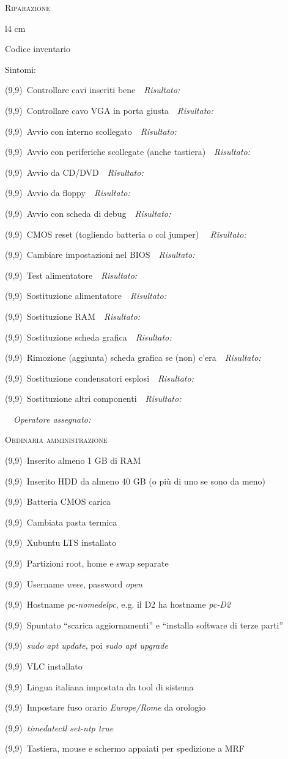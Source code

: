 \documentclass[a4paper,12pt,twoside]{article}
\newcommand{\rulespace}[1]{\ \ \textit{\small #1} \hrulefill\par}
\renewcommand{\r}{\rulespace{Risultato:}}
\renewcommand{\c}{\framebox(9,9){}\, }
\newcommand{\ci}{\hspace{1cm}\c} %
\begin{document}
\thispagestyle{empty}
{\Large\textsc{Riparazione}}\par
\begin{wrapfigure}{l}{4 cm}
	\vspace{-0.5cm}
	\begin{framed}
		\begin{centering}
		{\footnotesize Codice inventario\par}
		\vspace{2.4cm}
		\end{centering}		
	\end{framed}
	\vspace{-1.4cm}
\end{wrapfigure}
Sintomi: \hrulefill\par
\hrulefill\par
\c Controllare cavi inseriti bene\r
\c Controllare cavo VGA in porta giusta\r
\c Avvio con interno scollegato\r
\c Avvio con periferiche scollegate (anche tastiera)\r
\c Avvio da CD/DVD\r
\c Avvio da floppy\r
\c Avvio con scheda di debug\r
\c CMOS reset (togliendo batteria o col jumper) \r
\c Cambiare impostazioni nel BIOS\r
\c Test alimentatore\r
\c Sostituzione alimentatore\r
\c Sostituzione RAM\r
\c Sostituzione scheda grafica\r
\c Rimozione (aggiunta) scheda grafica se (non) c'era\r
\c Sostituzione condensatori esplosi\r
\c Sostituzione altri componenti\r
\rulespace{Operatore assegnato:}
{\Large\textsc{Ordinaria amministrazione}}\par
\c Inserito almeno 1 GB di RAM\par
\c Inserito HDD da almeno 40 GB (o più di uno se sono da meno)\par
\c Batteria CMOS carica\par
\c Cambiata pasta termica\par
\c Xubuntu LTS installato\par
\ci Partizioni root, home e swap separate\par
\ci Username \textit{weee}, password \textit{open}\par
\ci Hostname \textit{pc-nomedelpc}, e.g. il D2 ha hostname \textit{pc-D2}\par
\ci Spuntato ``scarica aggiornamenti'' e ``installa software di terze parti''\par
\ci \textit{sudo apt update}, poi \textit{sudo apt upgrade}\par
\ci VLC installato\par
\ci Lingua italiana impostata da tool di sistema\par
\ci Impostare fuso orario \textit{Europe/Rome} da orologio\par
\ci \textit{timedatectl set-ntp true}\par
\c Tastiera, mouse e schermo appaiati per spedizione a MRF
\end{document}
